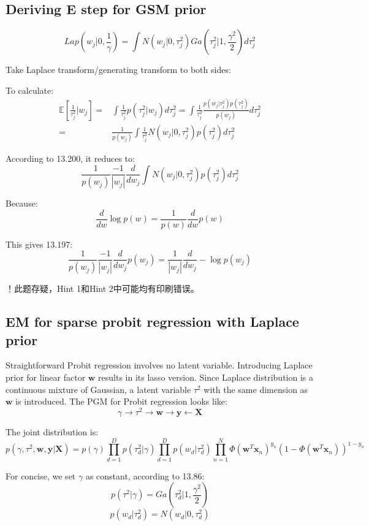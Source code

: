 \documentclass[UTF8]{ctexart}
\begin{document}
\subsection{Deriving E step for GSM prior}
$$Lap(w_{j}|0,\frac{1}{\gamma})=\int N(w_{j}|0,\tau_{j}^{2})Ga(\tau_{j}^{2}|1,\frac{\gamma^{2}}{2})d\tau_{j}^{2}$$

Take Laplace transform/generating transform to both sides:

To calculate:
\begin{align}
\mathbb{E}[\frac{1}{\tau_{j}^{2}}|w_{j}]=&\int \frac{1}{\tau_{j}^{2}}p(\tau_{j}^{2}|w_{j})d\tau_{j}^{2}=\int \frac{1}{\tau_{j}^{2}}\frac{p(w_{j}|\tau_{j}^{2})p(\tau_{j}^{2})}{p(w_{j})}d\tau_{j}^{2}\nonumber \\
=&\frac{1}{p(w_{j})}\int \frac{1}{\tau_{j}^{2}}N(w_{j}|0,\tau_{j}^{2})p(\tau_{j}^{2})d\tau_{j}^{2}\nonumber
\end{align}

According to 13.200, it reduces to:
$$\frac{1}{p(w_{j})}\frac{-1}{|w_{j}|}\frac{d}{dw_{j}}\int N(w_{j}|0,\tau_{j}^{2})p(\tau_{j}^{2})d\tau_{j}^{2}$$

Because:
$$\frac{d}{dw} \log p(w) = \frac{1}{p(w)}\frac{d}{dw}p(w)$$

This gives 13.197:
$$\frac{1}{p(w_{j})}\frac{-1}{|w_{j}|}\frac{d}{dw_{j}}p(w_{j})=\frac{1}{|w_{j}|}\frac{d}{dw_{j}}-\log p(w_{j})$$

！此题存疑，Hint 1和Hint 2中可能均有印刷错误。

\subsection{EM for sparse probit regression with Laplace prior}
Straightforward Probit regression involves no latent variable. Introducing Laplace prior for linear factor $\textbf{w}$ results in its lasso version. Since Laplace distribution is a continuous mixture of Gaussian, a latent variable $\tau^{2}$ with the same dimension as $\textbf{w}$ is introduced. The PGM for Probit regression looks like:
$$\gamma \rightarrow \tau^{2} \rightarrow \textbf{w} \rightarrow \textbf{y} \leftarrow \textbf{X}$$

The joint distribution is:
$$p(\gamma,\tau^{2},\textbf{w},\textbf{y}|\textbf{X})=p(\gamma)\prod_{d=1}^{D}p(\tau_{d}^{2}|\gamma)\prod_{d=1}^{D}p(w_{d}|\tau_{d}^{2})\prod_{n=1}^{N}\Phi(\textbf{w}^{T}\textbf{x}_{n})^{y_{n}}(1-\Phi(\textbf{w}^{T}\textbf{x}_{n}))^{1-y_{n}}$$

For concise, we set $\gamma$ as constant, according to 13.86:
$$p(\tau^{2}|\gamma)=Ga(\tau_{d}^{2}|1,\frac{\gamma^{2}}{2})$$
$$p(w_{d}|\tau_{d}^{2})=N(w_{d}|0,\tau_{d}^{2})$$
\end{document}
